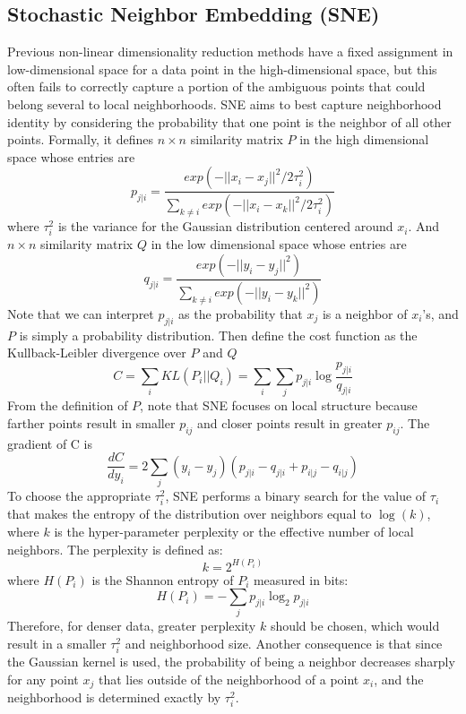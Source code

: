 \subsection{Stochastic Neighbor Embedding (SNE)}
Previous non-linear dimensionality reduction methods have a fixed
assignment in low-dimensional space for a data point in the
high-dimensional space, but this often fails to correctly capture a
portion of the ambiguous points that could belong several to local
neighborhoods. SNE aims to best capture neighborhood identity by
considering the probability that one point is the neighbor of all
other points. Formally, it defines $n\times n$ similarity matrix $P$
in the high dimensional space whose entries are 
\[ p_{j\vert i} = \frac{exp(-\vert \vert x_i -x_j \vert \vert^2 /
  2\tau_i^2)}{\sum_{k\neq i} exp(-\vert \vert x_i -x_k \vert \vert^2 /
  2\tau_i^2)}\] 
where $\tau_i^2$ is the variance for the Gaussian distribution
centered around $x_i$. And $n\times n$ similarity matrix $Q$ in the
low dimensional space whose entries are 
\[
q_{j\vert i} = \frac{exp(-\vert \vert y_i - y_j \vert
  \vert^2)}{\sum_{k\neq i} exp(-\vert \vert y_i -y_k \vert \vert^2)} 
\]
Note that we can interpret $p_{j\vert i}$ as the probability that
$x_j$ is a neighbor of $x_i$'s, and $P$ is simply a probability
distribution. Then define the cost function as the Kullback-Leibler
divergence over $P$ and $Q$ 
\[
C=\sum_i KL(P_i \vert \vert Q_i) = \sum_i \sum_j p_{j\vert i} \log
\frac{p_{j \vert i}}{q_{j \vert i}} 
\]
From the definition of $P$, note that SNE focuses on local structure
because farther points result in smaller $p_{ij}$ and closer points
result in greater $p_{ij}$. The gradient of C is 
\[\frac{dC}{dy_i}=2\sum_{j} (y_i-y_j)(p_{j|i}-q_{j|i}+p_{i|j}-q_{i|j}) \]
To choose the appropriate $\tau_i^2$, SNE performs a binary search for
the value of $\tau_i$ that makes the entropy of the distribution over
neighbors equal to $\log(k)$, where $k$ is the hyper-parameter
perplexity or the effective number of local neighbors. The perplexity
is defined as: 
\[
k=2^{H(P_i)}
\]
where $H(P_i)$ is the Shannon entropy of $P_i$ measured in bits:
\[
H(P_i)=-\sum_j p_{j \vert i} \log_2 p_{j \vert i}
\]
Therefore, for denser data, greater perplexity $k$ should be chosen,
which would result in a smaller $\tau_i^2$ and neighborhood
size. Another consequence is that since the Gaussian kernel is used,
the probability of being a neighbor decreases sharply for any point
$x_j$ that lies outside of the neighborhood of a point $x_i$, and the
neighborhood is determined exactly by $\tau_i^2$. 

